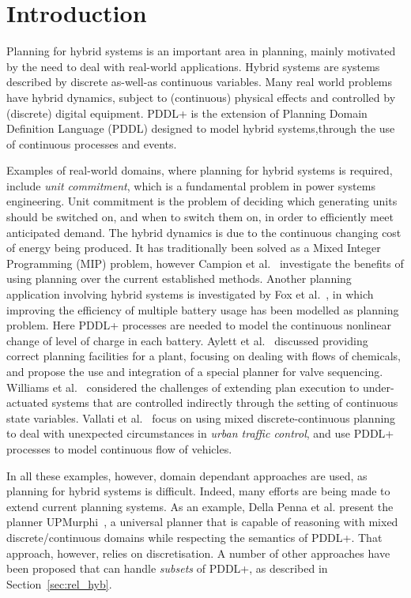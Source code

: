\section{Introduction}

Planning for hybrid systems is an important area in planning, mainly motivated by the need to deal with real-world applications. Hybrid systems are systems described by discrete as-well-as continuous variables.
Many real world problems have hybrid dynamics, subject to (continuous) physical effects and controlled by (discrete) digital equipment. PDDL+ \cite{pddl+} is the extension of Planning Domain Definition Language (PDDL) designed to model hybrid systems,through the use of continuous processes and events.

Examples of real-world domains, where planning for hybrid systems is required, include \textit{unit commitment}, which is a fundamental problem in power systems engineering. Unit commitment is the problem of deciding which generating units should be switched on, and when to switch them on, in order to efficiently meet anticipated demand. The hybrid dynamics is due to the continuous changing cost of energy being produced. It has traditionally been solved as a Mixed Integer Programming (MIP) problem, however Campion et al.~\cite{ucp} investigate the benefits of using planning over the current established methods.
Another planning application involving hybrid systems is investigated by Fox et al.~\cite{battery}, in which improving the efficiency of multiple battery usage has been modelled as planning problem. Here PDDL+ processes are needed to model the continuous nonlinear change of level of charge in each battery. Aylett et al.~\cite{aylett1998ai} discussed providing correct planning facilities for a plant, focusing on dealing with flows of chemicals, and propose the use and integration of a special planner for valve sequencing. Williams et al.~\cite{leaute2005coordinating} considered the challenges of extending plan execution to under-actuated systems that are controlled indirectly through the setting of continuous state variables.
Vallati et al.~\cite{utc} focus on using mixed discrete-continuous planning to deal with unexpected circumstances in \textit{urban traffic control}, and use PDDL+ processes to model continuous flow of vehicles. 

In all these examples, however, domain dependant approaches are used, as planning for hybrid systems is difficult. Indeed, many efforts are being made to extend current planning systems. As an example, Della Penna et al. present the planner {UPMurphi}~\cite{upmurphi}, a universal planner that is capable of reasoning with mixed discrete/continuous domains while respecting the semantics of PDDL+. That approach, however, relies on discretisation. A number of other approaches have been proposed that can handle \textit{subsets} of PDDL+, as described in Section~\ref{sec:rel_hyb}.

